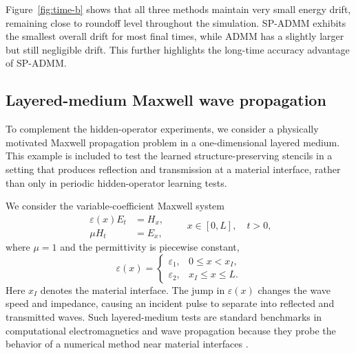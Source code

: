 \documentclass[11pt]{article}
\numberwithin{equation}{section}
\numberwithin{figure}{section}
\numberwithin{table}{section}
\begin{document}
Figure~\ref{fig:time-b} shows that all three methods maintain very small
energy drift, remaining close to roundoff level throughout the simulation.
SP-ADMM exhibits the smallest overall drift for most final times, while ADMM
has a slightly larger but still negligible drift. This further highlights the long-time accuracy advantage of SP-ADMM.

\subsection{Layered-medium Maxwell wave propagation}
\label{subsec:layered-medium}

To complement the hidden-operator experiments, we consider a physically
motivated Maxwell propagation problem in a one-dimensional layered medium.
This example is included to test the learned structure-preserving stencils
in a setting that produces reflection and transmission at a material
interface, rather than only in periodic hidden-operator learning tests.

We consider the variable-coefficient Maxwell system
\begin{equation}
\begin{aligned}
  \varepsilon(x) E_t &= H_x,\\
  \mu H_t &= E_x,
\end{aligned}
\qquad x\in[0,L], \quad t>0,
\label{eq:layered-maxwell}
\end{equation}
where $\mu=1$ and the permittivity is piecewise constant,
\begin{equation}
  \varepsilon(x)=
  \begin{cases}
  \varepsilon_1, & 0\le x < x_I,\\
  \varepsilon_2, & x_I\le x \le L.
  \end{cases}
  \label{eq:layered-eps}
\end{equation}
Here $x_I$ denotes the material interface. The jump in $\varepsilon(x)$ changes
the wave speed and impedance, causing an incident pulse to separate into
reflected and transmitted waves. Such layered-medium tests are standard
benchmarks in computational electromagnetics and wave propagation because they
probe the behavior of a numerical method near material interfaces
\cite{yee1966numerical,taflove2000computational,leveque2007finite}.
\end{document}
